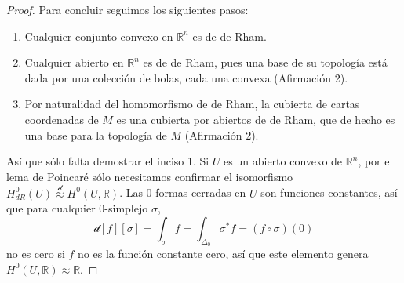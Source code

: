 \documentclass[spanish]{article}
\theoremstyle{definition}
\newcommand{\R}{\mathbb{R}}
\begin{document}
\begin{proof}
		Para concluir seguimos los siguientes pasos:
		\begin{enumerate}
			\item Cualquier conjunto convexo en $\R^n$ es de de Rham.
			\item Cualquier abierto en $\R^n$ es de de Rham, pues una base de su topología está dada por una colección de bolas, cada una convexa (Afirmación 2).
			\item Por naturalidad del homomorfismo de de Rham, la cubierta de cartas coordenadas de $M$ es una cubierta por abiertos de de Rham, que de hecho es una base para la topología de $M$ (Afirmación 2).
		\end{enumerate}
		Así que sólo falta demostrar el inciso 1. Si $U$ es un abierto convexo de $\R^n$, por el lema de Poincaré sólo necesitamos confirmar el isomorfismo $H^0_{dR}(U)\overset{\mathcal{d}}{\approx}H^0(U,\R)$. Las 0-formas cerradas en $U$ son funciones constantes, así que para cualquier 0-simplejo $\sigma$,
		\[\mathcal{d}[f][\sigma]=\int_{\sigma}f=\int_{\Delta_0}\sigma^*f=(f\circ\sigma)(0)\]
		no es cero si $f$ no es la función constante cero, así que este elemento genera $H^0(U,\R)\approx\R$.
		

	
		\iffalse 
		\begin{enumerate}
			\item La unión disjunta de variedades de de Rham es de de Rham.
			
			\item Cualquier convexo en $\R^n$ es de de Rham.
			
			\item Si $M$ tiene una cubierta finita de de Rham, $M$ es de de Rham.
			
			\item Si la topología de $M$ tiene una base por abiertos de de Rham, $M$ es de de Rham.
			
			\item Cualquier abierto en $\R^n$ es de de Rham.
			
			\item Cualquier variedad suave es de de Rham.
			
			
			
	\end{enumerate}\fi
		

\end{proof}
\end{document}
